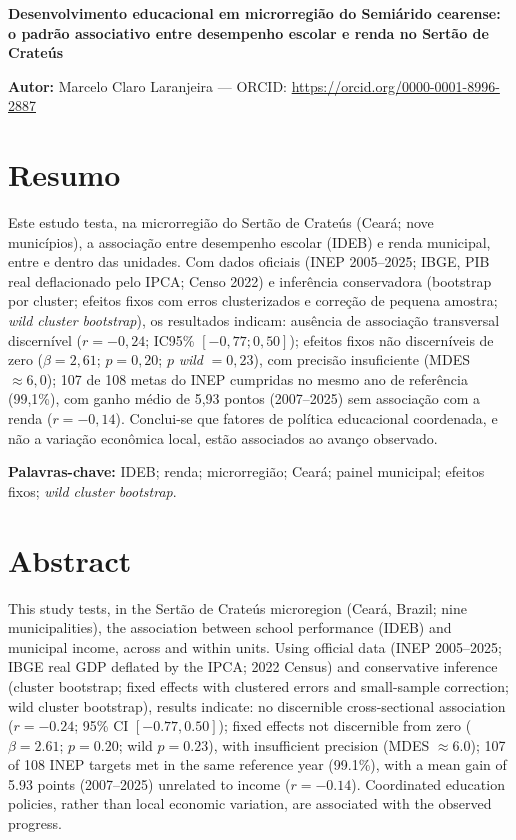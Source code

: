 \documentclass[12pt,a4paper]{article}
\begin{document}
\begin{center}
{\Large\bfseries Desenvolvimento educacional em microrregião do Semiárido cearense: o padrão associativo entre desempenho escolar e renda no Sertão de Crateús}
\end{center}

\noindent\textbf{Autor:} Marcelo Claro Laranjeira --- ORCID: \href{https://orcid.org/0000-0001-8996-2887}{https://orcid.org/0000-0001-8996-2887}

\vspace{0.8cm}

\section*{Resumo}

Este estudo testa, na microrregião do Sertão de Crateús (Ceará; nove municípios), a associação entre desempenho escolar (IDEB) e renda municipal, entre e dentro das unidades. Com dados oficiais (INEP 2005--2025; IBGE, PIB real deflacionado pelo IPCA; Censo 2022) e inferência conservadora (bootstrap por cluster; efeitos fixos com erros clusterizados e correção de pequena amostra; \textit{wild cluster bootstrap}), os resultados indicam: ausência de associação transversal discernível ($r = -0{,}24$; IC95\% $[-0{,}77; 0{,}50]$); efeitos fixos não discerníveis de zero ($\beta = 2{,}61$; $p = 0{,}20$; $p$ \textit{wild} $= 0{,}23$), com precisão insuficiente (MDES $\approx 6{,}0$); 107 de 108 metas do INEP cumpridas no mesmo ano de referência (99,1\%), com ganho médio de 5,93 pontos (2007--2025) sem associação com a renda ($r = -0{,}14$). Conclui-se que fatores de política educacional coordenada, e não a variação econômica local, estão associados ao avanço observado.

\noindent\textbf{Palavras-chave:} IDEB; renda; microrregião; Ceará; painel municipal; efeitos fixos; \textit{wild cluster bootstrap}.

\section*{Abstract}

This study tests, in the Sertão de Crateús microregion (Ceará, Brazil; nine municipalities), the association between school performance (IDEB) and municipal income, across and within units. Using official data (INEP 2005--2025; IBGE real GDP deflated by the IPCA; 2022 Census) and conservative inference (cluster bootstrap; fixed effects with clustered errors and small-sample correction; wild cluster bootstrap), results indicate: no discernible cross-sectional association ($r = -0.24$; 95\% CI $[-0.77, 0.50]$); fixed effects not discernible from zero ($\beta = 2.61$; $p = 0.20$; wild $p = 0.23$), with insufficient precision (MDES $\approx 6.0$); 107 of 108 INEP targets met in the same reference year (99.1\%), with a mean gain of 5.93 points (2007--2025) unrelated to income ($r = -0.14$). Coordinated education policies, rather than local economic variation, are associated with the observed progress.
\end{document}
